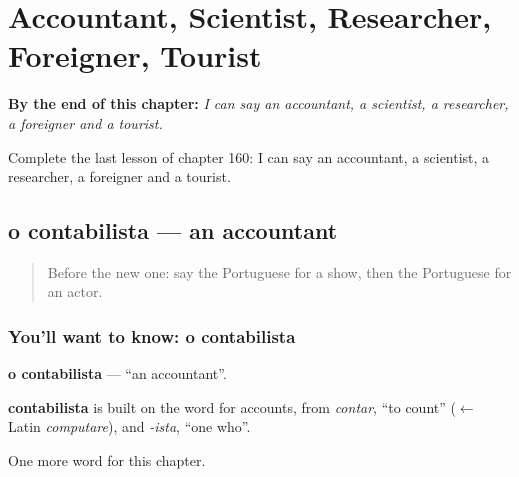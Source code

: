 
\chapter{Accountant, Scientist, Researcher, Foreigner, Tourist}
\label{ch:pt-accountant-scientist-researcher-foreigner-tourist}

\begin{chapteropening}
\textbf{By the end of this chapter:} \emph{I can say an accountant, a scientist, a researcher, a foreigner and a tourist.}

Complete the last lesson of chapter 160: I can say an accountant, a scientist, a researcher, a foreigner and a tourist.
\end{chapteropening}

\section[o contabilista]{o contabilista — an accountant}

\label{lesson:PT-C160-contabilista}



\begin{quote}
Before the new one: say the Portuguese for a show, then the Portuguese for an actor.
\end{quote}

\subsection*{You'll want to know: o contabilista}
\textbf{o contabilista} — \textquotedblleft{}an accountant\textquotedblright{}.

\begin{cousinweb}
\textbf{contabilista} is built on the word for accounts, from \emph{contar}, \textquotedblleft{}to count\textquotedblright{} ($\leftarrow$ Latin \emph{computare}), and \emph{-ista}, \textquotedblleft{}one who\textquotedblright{}.
\end{cousinweb}

\begin{grammarlens}[title={What you've built}]
One more word for this chapter.
\end{grammarlens}

